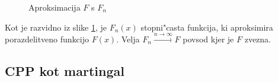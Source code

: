 \documentclass[12pt, a4paper, reqno]{amsart}
\theoremstyle{definition} %
\theoremstyle{plain} %
\newcommand{\R}{\mathbb{R}}
\newcommand{\Prob}{\mathbb{P}}
\newcommand{\1}{\mathds{1}}
\begin{document}
\begin{figure}[H]
\begin{center}
\begin{tikzpicture}
                
                
                \end{tikzpicture}
                \caption{Aproksimacija $F$ s $F_n$}
                \label{fig:slika2}
            \end{center}
        \end{figure}

    \noindent
    Kot je razvidno iz slike \ref{fig:slika2}, je $F_n(x)$ stopni"casta funkcija, ki aproksimira 
    porazdelitveno funkcijo $F(x)$. Velja $F_n \xrightarrow{n\to\infty}F$ povsod kjer je $F$ zvezna.



%
%
%
%
%
%
%
%

    \subsection{CPP kot martingal}
\end{document}

